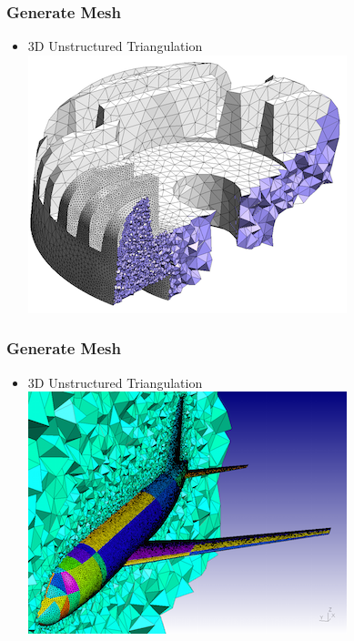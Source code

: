 \documentclass[10pt]{beamer}
\begin{document}
  \begin{frame}
    \frametitle{Generate Mesh}
    \begin{itemize}
      \item 3D Unstructured Triangulation
          \includegraphics[scale=0.6]{Figures/3Dmesh}
    \end{itemize}
  \end{frame}

  \begin{frame}
    \frametitle{Generate Mesh}
    \begin{itemize}
      \item 3D Unstructured Triangulation
          \includegraphics[scale=0.6]{Figures/3Dmesh2}
    \end{itemize}
  \end{frame}
\end{document}
